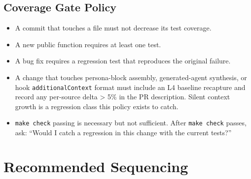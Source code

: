 \documentclass[a4paper,10pt]{article}
\newcommand{\field}[1]{\texttt{#1}}
\newcommand{\cmd}[1]{\texttt{#1}}
\begin{document}
\subsection{Coverage Gate Policy}

\begin{itemize}
  \item A commit that touches a file must not decrease its test
    coverage.
  \item A new public function requires at least one test.
  \item A bug fix requires a regression test that reproduces the
    original failure.
  \item A change that touches persona-block assembly, generated-agent
    synthesis, or hook \field{additionalContext} format must include
    an L4 baseline recapture and record any per-source delta > 5\%
    in the PR description.  Silent context growth is a regression
    class this policy exists to catch.
  \item \cmd{make check} passing is necessary but not sufficient.
    After \cmd{make check} passes, ask: ``Would I catch a regression
    in this change with the current tests?''
\end{itemize}

\section{Recommended Sequencing}
\end{document}
